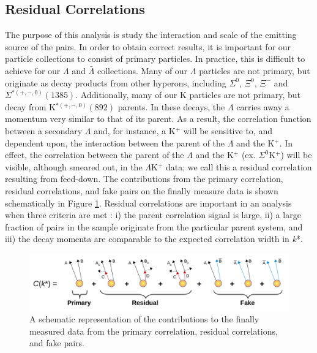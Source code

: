 \documentclass[../AnalysisNoteJBuxton.tex]{subfiles}
\begin{document}
\subsection{Residual Correlations}
\label{ResidualCorrelations}

The purpose of this analysis is study the interaction and scale of the emitting source of the pairs.
In order to obtain correct results, it is important for our particle collections to consist of primary particles.
In practice, this is difficult to achieve for our $\Lambda$ and $\bar{\Lambda}$ collections.
Many of our $\Lambda$ particles are not primary, but originate as decay products from other hyperons, including $\Sigma^{0}$, $\Xi^{0}$, $\Xi^{-}$ and $\Sigma^{*(+,-,0)}(1385)$.  Additionally, many of our K particles are not primary, but decay from K$^{*(+,-,0)}(892)$ parents.
In these decays, the $\Lambda$ carries away a momentum very similar to that of its parent.
As a result, the correlation function between a secondary $\Lambda$ and, for instance, a K$^{+}$  will be sensitive to, and dependent upon, the interaction between the parent of the $\Lambda$ and the K$^{+}$.
In effect, the correlation between the parent of the $\Lambda$ and the K$^{+}$ (ex. $\Sigma^{0}$K$^{+}$) will be visible, although smeared out, in the $\Lambda$K$^{+}$ data; we call this a residual correlation resulting from feed-down.
The contributions from the primary correlation, residual correlations, and fake pairs on the finally measure data is shown schematically in Figure \ref{fig:ResidualsCartoon}.
Residual correlations are important in an analysis when three criteria are met \cite{Kisiel:2014mma}: i) the parent correlation signal is large, ii) a large fraction of pairs in the sample originate from the particular parent system, and iii) the decay momenta are comparable to the expected correlation width in \textit{k}*. 


\begin{figure}[h]
  \centering
  \includegraphics[width=\textwidth]{5_Fitting/Figures/ResidualCartoons_p3.pdf}
  \caption[Residual Contributions Cartoon]{A schematic representation of the contributions to the finally measured data from the primary correlation, residual correlations, and fake pairs.}
  \label{fig:ResidualsCartoon}
\end{figure}
\end{document}
